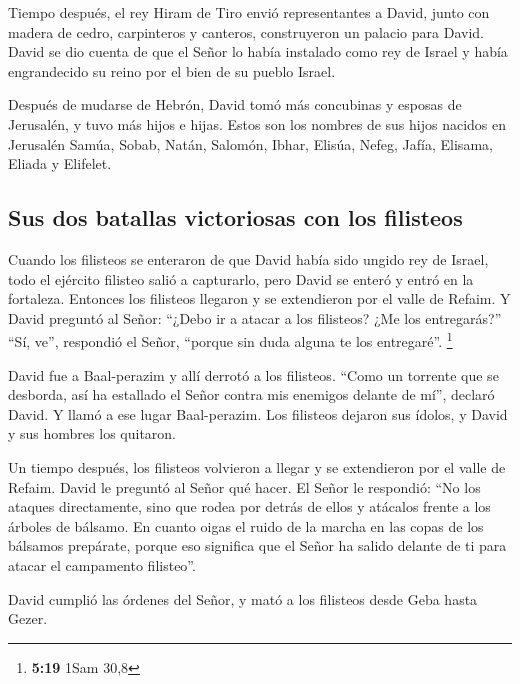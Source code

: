  Tiempo después, el rey Hiram de Tiro envió
representantes a David, junto con madera de cedro, carpinteros y
canteros, construyeron un palacio para David.  David se
dio cuenta de que el Señor lo había instalado como rey de Israel y había
engrandecido su reino por el bien de su pueblo Israel.

 Después de mudarse de Hebrón, David tomó más concubinas
y esposas de Jerusalén, y tuvo más hijos e hijas.  Estos
son los nombres de sus hijos nacidos en Jerusalén Samúa, Sobab, Natán,
Salomón,  Ibhar, Elisúa, Nefeg, Jafía, 
Elisama, Eliada y Elifelet.

\hypertarget{sus-dos-batallas-victoriosas-con-los-filisteos}{%
\subsection{Sus dos batallas victoriosas con los
filisteos}\label{sus-dos-batallas-victoriosas-con-los-filisteos}}

 Cuando los filisteos se enteraron de que David había
sido ungido rey de Israel, todo el ejército filisteo salió a capturarlo,
pero David se enteró y entró en la fortaleza.  Entonces
los filisteos llegaron y se extendieron por el valle de Refaim.
 Y David preguntó al Señor: ``¿Debo ir a atacar a los
filisteos? ¿Me los entregarás?'' ``Sí, ve'', respondió el Señor,
``porque sin duda alguna te los entregaré''. \footnote{\textbf{5:19}
  1Sam 30,8}

 David fue a Baal-perazim y allí derrotó a los filisteos.
``Como un torrente que se desborda, así ha estallado el Señor contra mis
enemigos delante de mí'', declaró David. Y llamó a ese lugar
Baal-perazim.  Los filisteos dejaron sus ídolos, y David
y sus hombres los quitaron.

 Un tiempo después, los filisteos volvieron a llegar y se
extendieron por el valle de Refaim.  David le preguntó al
Señor qué hacer. El Señor le respondió: ``No los ataques directamente,
sino que rodea por detrás de ellos y atácalos frente a los árboles de
bálsamo.  En cuanto oigas el ruido de la marcha en las
copas de los bálsamos prepárate, porque eso significa que el Señor ha
salido delante de ti para atacar el campamento filisteo''.

 David cumplió las órdenes del Señor, y mató a los
filisteos desde Geba hasta Gezer.

